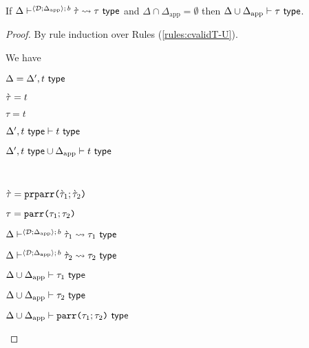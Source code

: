 \begin{lemma}\label{lemma:candidate-expansion-type-validation}
If $\Delta\vdash^{\langle \mathcal{D}; \Delta_\text{app} \rangle;\,b} \grave{\tau} \leadsto \tau~\mathsf{type}$ and $\Delta \cap \Delta_\text{app}=\emptyset$ then ${\Delta}\cup{\Delta_\text{app}} \vdash \tau~\mathsf{type}$.
\end{lemma}
\begin{proof} By rule induction over Rules (\ref{rules:cvalidT-U}).
\begin{byCases}
\item[\text{(\ref{rule:cvalidT-U-tvar})}] We have 
\begin{pfsteps*}
   \item $\Delta=\Delta', t~\mathsf{type}$ 
   \item $\grave{\tau}=t$ 
   \item $\tau=t$ 
   \item $\Delta', t~\mathsf{type} \vdash t~\mathsf{type}$  
   \item ${\Delta', t~\mathsf{type}}\cup{\Delta_\text{app}} \vdash t~\mathsf{type}$ 
 \end{pfsteps*} 
\resetpfcounter

\item[\text{(\ref{rule:cvalidT-U-parr})}] ~
\begin{pfsteps*}
  \item $\grave{\tau}=\texttt{prparr}\texttt{(}\grave{\tau}_1; \grave{\tau}_2\texttt{)}$ 
  \item $\tau=\texttt{parr}\texttt{(}\tau_1; \tau_2\texttt{)}$ 
  \item $\Delta\vdash^{\langle \mathcal{D}; \Delta_\text{app} \rangle;\,b} \grave{\tau}_1 \leadsto \tau_1~\mathsf{type}$  
  \item $\Delta\vdash^{\langle \mathcal{D}; \Delta_\text{app} \rangle;\,b} \grave{\tau}_2 \leadsto \tau_2~\mathsf{type}$  
  \item ${\Delta}\cup{\Delta_\text{app}} \vdash \tau_1~\mathsf{type}$  
  \item ${\Delta}\cup{\Delta_\text{app}} \vdash \tau_2~\mathsf{type}$  
  \item ${\Delta}\cup{\Delta_\text{app}} \vdash \texttt{parr}\texttt{(}\tau_1; \tau_2\texttt{)}~\mathsf{type}$ 
\end{pfsteps*}
\resetpfcounter


\end{byCases}
\end{proof}
